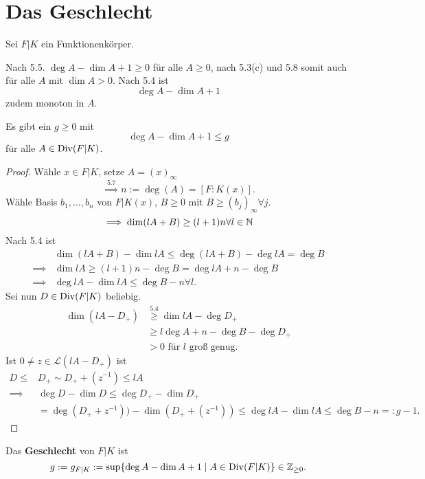 \section{Das Geschlecht}
Sei $F|K$ ein Funktionenkörper.

\begin{bemerkungnr}
    Nach 5.5. $ \deg A - \dim A + 1 \geq 0$ für alle $A \geq 0$, nach 5.3(c) und 5.8 somit auch für alle
    $A$ mit $\dim A > 0$. Nach 5.4 ist 
    $$ \deg A - \dim A +1 $$
    zudem monoton in $A$.
\end{bemerkungnr}

\begin{satz}
    Es gibt ein $g \geq 0$ mit
    $$ \deg A - \dim A + 1 \leq g$$
    für alle $A \in \operatorname{Div}(F|K)$.
\end{satz}
\begin{proof}
    Wähle $x \in F|K$, setze $A = (x)_\infty$
    $$ \stackrel{5.7}{\implies} n := \deg (A) = [F : K(x)].$$
    Wähle Basis $b_1,\ldots,b_n$ von $F|K(x)$, $B \geq 0$ mit $B \geq (b_j)_\infty \forall j$.
    $$ \implies \dim (lA + B) \geq (l+1)n \forall l \in \mathbb{N}$$
    Nach 5.4 ist 
    \begin{align*}
        &\dim (lA+B) - \dim lA \leq \deg (lA + B) - \deg lA = \deg B\\
        \implies& \dim lA \geq (l+1)n - \deg B = \deg lA + n - \deg B\\
        \implies& \deg lA - \dim lA \leq \deg B - n \forall l.
    \end{align*}
    Sei nun $D \in \operatorname{Div}(F|K)$ beliebig.
    \begin{align*}
        \dim (lA - D_+) &\stackrel{5.4}{\geq} \dim lA - \deg D_+\\
        & \geq l \deg A + n - \deg B - \deg D_+\\
        &> 0 \text{ für } l \text{ groß genug.}
    \end{align*}
    Ist $0 \ne z \in \mathcal{L}(lA - D_+)$ ist
    \begin{align*}
        D \leq& D_+ \sim D_+ + (z^{-1}) \leq lA \\
        \implies& \deg D - \dim D \leq \deg D_+ - \dim D_+\\
        &= \deg (D_+ + z^{-1})) - \dim (D_+ + (z^{-1})) \leq \deg lA - \dim lA \leq \deg B -n =: g - 1.
    \end{align*}
\end{proof}

\begin{definition}
    Das \textbf{Geschlecht} von $F|K$ ist
    $$ g := g_{F|K} := \sup \{\deg A - \dim A + 1 \mid A \in \operatorname{Div}(F|K)\} \in \mathbb{Z}_{\geq 0}.$$
\end{definition}

